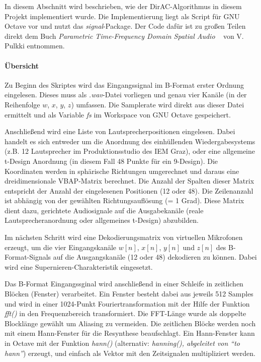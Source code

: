 In diesem Abschnitt wird beschrieben, wie der DirAC-Algorithmus in diesem Projekt implementiert wurde. Die Implementierung liegt als Script für GNU Octave vor und nutzt das \textit{signal}-Package. Der Code dafür ist zu großen Teilen direkt dem Buch \textit{Parametric Time-Frequency Domain Spatial Audio} ~\cite{spatial-book} von V. Pulkki entnommen.

\paragraph{Übersicht}
Zu Beginn des Skriptes wird das Eingangssignal im B-Format erster Ordnung eingelesen. Dieses muss als \textit{.wav}-Datei vorliegen und genau vier Kanäle (in der Reihenfolge $w$, $x$, $y$, $z$) umfassen. Die Samplerate wird direkt aus dieser Datei ermittelt und als Variable \textit{fs} im Workspace von GNU Octave gespeichert.

Anschließend wird eine Liste von Lautsprecherpositionen eingelesen. Dabei handelt es sich entweder um die Anordnung des einhüllenden Wiedergabesystems (z.B. 12 Lautsprecher im Produktionsstudio des IEM Graz), oder eine allgemeine t-Design Anordnung (in diesem Fall 48 Punkte für ein 9-Design). Die Koordinaten werden in sphärische Richtungen umgerechnet und daraus eine dreidimensionale VBAP-Matrix berechnet. Die Anzahl der Spalten dieser Matrix entspricht der Anzahl der eingelesenen Positionen (12 oder 48). Die Zeilenanzahl ist abhängig von der gewählten Richtungsauflösung (= 1 Grad). Diese Matrix dient dazu, gerichtete Audiosignale auf die Ausgabekanäle (reale Lautsprecheranordnung oder allgemeines t-Design) abzubilden.

Im nächsten Schritt wird eine Dekodierungsmatrix von virtuellen Mikrofonen erzeugt, um die vier Eingangskanäle $w[n]$, $x[n]$, $y[n]$ und $z[n]$ des B-Format-Signals auf die Ausgangskanäle (12 oder 48) dekodieren zu können. Dabei wird eine Supernieren-Charakteristik eingesetzt.

Das B-Format Eingangssginal wird anschließend in einer Schleife in zeitlichen Blöcken (Fenster) verarbeitet. Ein Fenster besteht dabei aus jeweils 512 Samples und wird in einer 1024-Punkt Fouriertransformation mit der Hilfe der Funktion \textit{fft()} in den Frequenzbereich transformiert. Die FFT-Länge wurde als doppelte Blocklänge gewählt um Aliasing zu vermeiden. Die zeitlichen Blöcke werden noch mit einem Hann-Fenster für die Resynthese beaufschlagt. Ein Hann-Fenster kann in Octave mit der Funktion \textit{hann()} (alternativ: \textit{hanning(), abgeleitet von ``to hann''}) erzeugt, und einfach als Vektor mit den Zeitsignalen multipliziert werden.